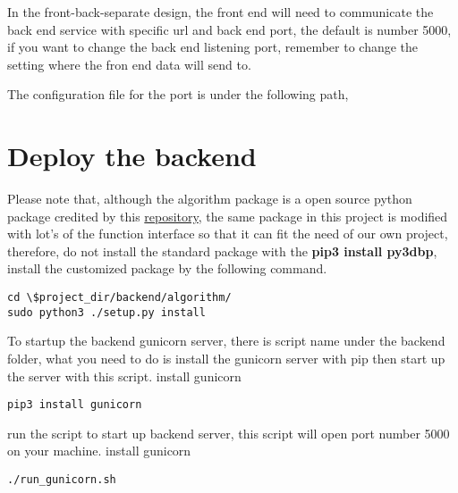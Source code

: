 \documentclass{article}
\begin{document}
In the front-back-separate design, the front end will need to communicate the back end service with specific url and back end port, the default is number 5000, if you want to change the back end listening port, remember to change the setting where the fron end data will send to.

The configuration file for the port is under the following path,\newline
{}



\section{Deploy the backend}
Please note that, although the algorithm package  is a open source python package  credited by this \href{https://github.com/enzoruiz/3dbinpacking}{\color{blue}repository}, the same package in this project is modified with lot's of the function interface so that it can fit the need of our own project, therefore, do not install the standard package with the \textbf{pip3 install py3dbp}, install the customized package by the following command.
\begin{mdframed}[backgroundcolor=bg]
\begin{verbatim}
cd \$project_dir/backend/algorithm/
sudo python3 ./setup.py install
\end{verbatim}
\end{mdframed}
To startup the backend gunicorn server, there is script name under the backend folder, what you need to do is install the gunicorn server with pip then start up the server with this script.\newline
\noindent install gunicorn
\begin{mdframed}[backgroundcolor=bg]
\begin{verbatim}
pip3 install gunicorn
\end{verbatim}
\end{mdframed}
\noindent run the script to start up backend server,
this script will open port number 5000 on your machine.
\noindent install gunicorn
\begin{mdframed}[backgroundcolor=bg]
\begin{verbatim}
./run_gunicorn.sh
\end{verbatim}
\end{mdframed}
\end{document}
